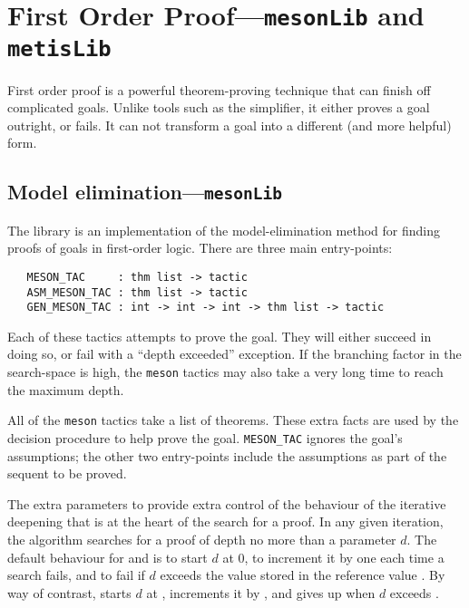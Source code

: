 {\section{First Order Proof---\texttt{mesonLib} and \texttt{metisLib}}
\label{sec:first-order-proof}

First order proof is a powerful theorem-proving technique that can
finish off complicated goals.  Unlike tools such as the simplifier, it
either proves a goal outright, or fails.  It can not transform a goal
into a different (and more helpful) form.

\subsection{Model elimination---\texttt{mesonLib}}
\label{sec:mesonLib}


The  library is an implementation of the
model-elimination method for finding proofs of goals in first-order
logic.  There are three main entry-points:
\begin{hol}
\begin{verbatim}
   MESON_TAC     : thm list -> tactic
   ASM_MESON_TAC : thm list -> tactic
   GEN_MESON_TAC : int -> int -> int -> thm list -> tactic
\end{verbatim}
\end{hol}

Each of these tactics attempts to prove the goal.  They will either
succeed in doing so, or fail with a ``depth exceeded'' exception.  If
the branching factor in the search-space is high, the \texttt{meson}
tactics may also take a very long time to reach the maximum depth.

All of the \texttt{meson} tactics take a list of theorems.  These
extra facts are used by the decision procedure to help prove the goal.
\texttt{MESON\_TAC} ignores the goal's assumptions; the other two
entry-points include the assumptions as part of the sequent to be
proved.

The extra parameters to  provide extra control of
the behaviour of the iterative deepening that is at the heart of the
search for a proof.  In any given iteration, the algorithm searches
for a proof of depth no more than a parameter $d$.  The default
behaviour for  and  is to start $d$
at 0, to increment it by one each time a search fails, and to fail if
$d$ exceeds the value stored in the reference value
.  By way of contrast,
 starts $d$ at , increments
it by , and gives up when $d$ exceeds .

}
